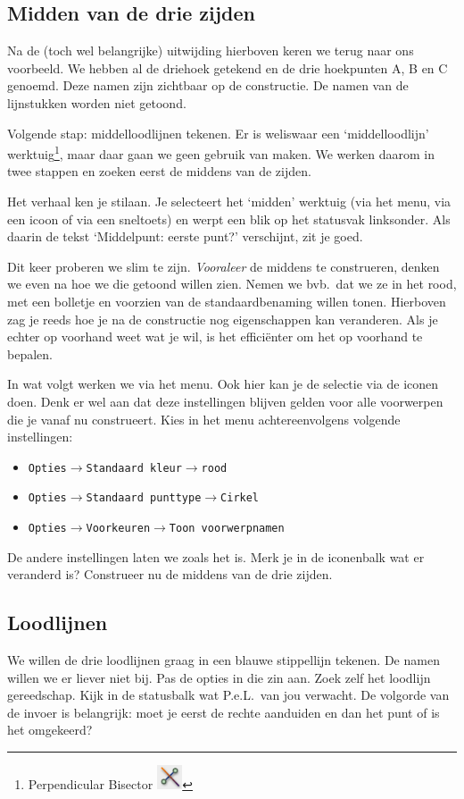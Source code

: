 \subsection{Midden van de drie zijden}
Na de (toch wel belangrijke) uitwijding hierboven keren we terug naar ons voorbeeld. We hebben al de driehoek getekend en de drie hoekpunten A, B en C genoemd. Deze namen zijn zichtbaar op de constructie. De namen van de lijnstukken worden niet getoond.

Volgende stap: middelloodlijnen tekenen. Er is weliswaar een `middelloodlijn' werktuig\footnote{Perpendicular Bisector \includegraphics[width=0.75cm]{figuren/PeL/middelloodlijnicoon.png}}, maar daar gaan we geen gebruik van maken. We werken daarom in twee stappen en zoeken eerst de middens van de zijden. 

Het verhaal ken je stilaan. Je selecteert het `midden' werktuig (via het menu, via een icoon of via een sneltoets) en werpt een blik op het statusvak linksonder. Als daarin de tekst `Middelpunt: eerste punt?' verschijnt, zit je goed. 

Dit keer proberen we slim te zijn. \emph{Vooraleer} de middens te construeren, denken we even na hoe we die getoond willen zien. Nemen we bvb.\ dat we ze in het rood, met een bolletje en voorzien van de standaardbenaming willen tonen. Hierboven zag je reeds hoe je na de constructie nog eigenschappen kan veranderen. Als je echter op voorhand weet wat je wil, is het effici\"{e}nter om het op voorhand te bepalen. 

In wat volgt werken we via het menu. Ook hier kan je de selectie via de iconen doen. Denk er wel aan dat deze instellingen blijven gelden voor alle voorwerpen die je vanaf nu construeert. Kies in het menu achtereenvolgens volgende instellingen:
\begin{itemize}
\item \texttt{Opties$\rightarrow$Standaard kleur$\rightarrow$rood}
\item \texttt{Opties$\rightarrow$Standaard punttype$\rightarrow$Cirkel}
\item \texttt{Opties$\rightarrow$Voorkeuren$\rightarrow$Toon voorwerpnamen}
\end{itemize}
De andere instellingen laten we zoals het is. Merk je in de iconenbalk wat er veranderd is? Construeer nu de middens van de drie zijden.

\subsection{Loodlijnen}
We willen de drie loodlijnen graag in een blauwe stippellijn tekenen. De namen willen we er liever niet bij. Pas de opties in die zin aan. Zoek zelf het loodlijn gereedschap. Kijk in de statusbalk wat P.e.L.\ van jou verwacht. De volgorde van de invoer is belangrijk: moet je eerst de rechte aanduiden en dan het punt of is het omgekeerd? 


